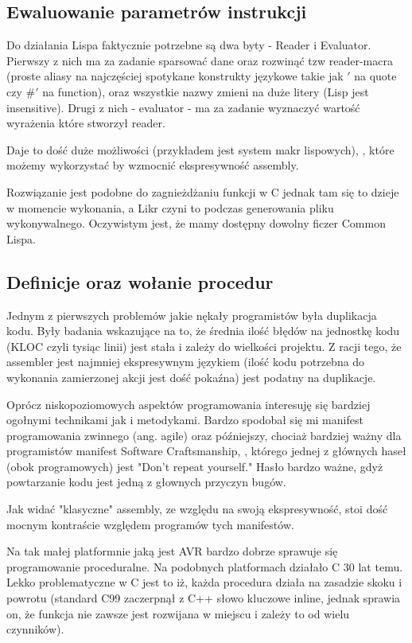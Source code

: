 \documentclass[11pt]{article}
\begin{document}
\subsection{Ewaluowanie parametrów instrukcji}

Do działania Lispa faktycznie potrzebne są dwa byty - Reader i Evaluator. Pierwszy z nich ma za zadanie sparsować dane oraz rozwinąć tzw reader-macra (proste aliasy na najczęściej spotykane konstrukty językowe takie jak $'$ na quote czy $\#'$ na function), oraz wszystkie nazwy zmieni na duże litery (Lisp jest insensitive). Drugi z nich - evaluator - ma za zadanie wyznaczyć wartość wyrażenia które stworzył reader. 

Daje to dość duże możliwości (przykładem jest system makr lispowych), , które możemy wykorzystać by wzmocnić ekspresywność assembly. 



Rozwiązanie jest podobne do zagnieżdżaniu funkcji w C jednak tam się to dzieje w momencie wykonania, a Likr czyni to podczas generowania pliku wykonywalnego. Oczywistym jest, że mamy dostępny dowolny ficzer Common Lispa.

\subsection{Definicje oraz wołanie procedur}

Jednym z pierwszych problemów jakie nękały programistów była duplikacja kodu. Były badania wskazujące na to, że  średnia ilość błędów na jednostkę kodu (KLOC czyli tysiąc linii) jest stała i zależy do wielkości projektu. Z racji tego, że assembler jest najmniej ekspresywnym językiem (ilość kodu potrzebna do wykonania zamierzonej akcji jest dość pokaźna) jest podatny na duplikacje.

Oprócz niskopoziomowych aspektów programowania interesuję się bardziej ogołnymi technikami jak i metodykami. Bardzo spodobał się mi manifest programowania zwinnego (ang. agile) oraz późniejszy, chociaż bardziej ważny dla programistów manifest Software Craftsmanship, , którego jednej z głównych haseł (obok programowych) jest "Don't repeat yourself." Hasło bardzo ważne, gdyż powtarzanie kodu jest jedną z głownych przyczyn bugów. 

Jak widać "klasyczne" assembly, ze względu na swoją ekspresywność, stoi dość mocnym kontraście względem
programów tych manifestów. 

Na tak małej platformnie jaką jest AVR bardzo dobrze sprawuje się programowanie proceduralne. Na podobnych platformach działało C 30 lat temu. Lekko problematyczne w C jest to iż, każda procedura działa na zasadzie skoku i powrotu (standard C99 zaczerpnął z C++ słowo kluczowe inline, jednak sprawia on, że funkcja nie zawsze jest rozwijana w miejscu i zależy to od wielu czynników). 
\end{document}
